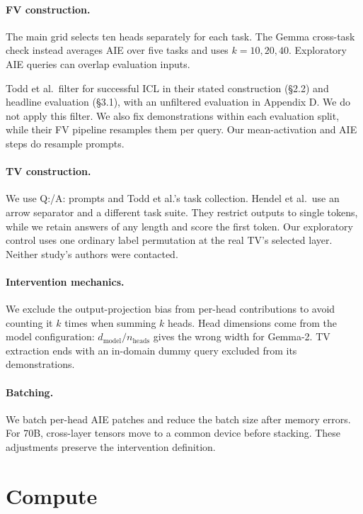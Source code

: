 \documentclass[11pt]{article}
\begin{document}
\paragraph{FV construction.} The main grid selects ten heads separately for each task. The Gemma cross-task check instead averages AIE over five tasks and uses $k=10,20,40$. Exploratory AIE queries can overlap evaluation inputs.

Todd et al.\ filter for successful ICL in their stated construction (\S2.2) and headline evaluation (\S3.1), with an unfiltered evaluation in Appendix D. We do not apply this filter. We also fix demonstrations within each evaluation split, while their FV pipeline resamples them per query. Our mean-activation and AIE steps do resample prompts.

\paragraph{TV construction.} We use Q:/A: prompts and Todd et al.'s task collection. Hendel et al.\ use an arrow separator and a different task suite. They restrict outputs to single tokens, while we retain answers of any length and score the first token. Our exploratory control uses one ordinary label permutation at the real TV's selected layer. Neither study's authors were contacted.

\paragraph{Intervention mechanics.} We exclude the output-projection bias from per-head contributions to avoid counting it $k$ times when summing $k$ heads. Head dimensions come from the model configuration: $d_{\text{model}}/n_{\text{heads}}$ gives the wrong width for Gemma-2. TV extraction ends with an in-domain dummy query excluded from its demonstrations.

\paragraph{Batching.} We batch per-head AIE patches and reduce the batch size after memory errors. For 70B, cross-layer tensors move to a common device before stacking. These adjustments preserve the intervention definition.

\section{Compute}
\label{sec:compute}
\end{document}
